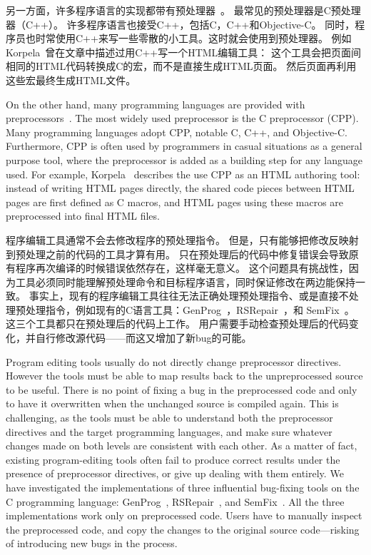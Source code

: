另一方面，许多程序语言的实现都带有预处理器~\parencite{ernst2002empirical,kohlbecker1986hygienic,lee2012marco}。
最常见的预处理器是C预处理器（C++）。
许多程序语言也接受C++，包括C，C++和Objective-C。
同时，程序员也时常使用C++来写一些零散的小工具。这时就会使用到预处理器。
例如Korpela~\parencite{Korpela2000}曾在文章中描述过用C++写一个HTML编辑工具：
这个工具会把页面间相同的HTML代码转换成C的宏，而不是直接生成HTML页面。
然后页面再利用这些宏最终生成HTML文件。

On the other hand, many programming languages are provided with
preprocessors~\parencite{ernst2002empirical,kohlbecker1986hygienic,lee2012marco}. The most
widely used preprocessor is the C preprocessor (CPP). Many programming
languages adopt CPP, notable C, C++, and
Objective-C. Furthermore, CPP is often used by
programmers in casual situations as a general purpose tool, 
where the preprocessor is added as a
building step for any language used. For example, Korpela~\parencite{Korpela2000} describes the
use CPP as an HTML authoring tool:
instead of writing HTML pages directly, the shared code pieces between HTML
pages are first defined as C macros, and HTML pages using these
macros are preprocessed into final HTML files.

程序编辑工具通常不会去修改程序的预处理指令。
但是，只有能够把修改反映射到预处理之前的代码的工具才算有用。
只在预处理后的代码中修复错误会导致原有程序再次编译的时候错误依然存在，这样毫无意义。
这个问题具有挑战性，因为工具必须同时能理解预处理命令和目标程序语言，同时保证修改在两边能保持一致。
事实上，现有的程序编辑工具往往无法正确处理预处理指令、或是直接不处理预处理指令，例如现有的C语言工具：GenProg~\parencite{le2012genprog,le2012systematic}，RSRepair~\parencite{QiMLDW14}，和
SemFix~\parencite{nguyen2013semfix}。
这三个工具都只在预处理后的代码上工作。
用户需要手动检查预处理后的代码变化，并自行修改源代码——而这又增加了新bug的可能。

Program editing tools usually do not directly change preprocessor directives. However the tools must be able to map results back to the unpreprocessed source to be useful. There is no point of fixing a bug in the preprocessed code and only to have it overwritten when the unchanged source is compiled again. This is challenging, as the tools must be able to understand both the preprocessor directives and the target programming languages, and make sure whatever changes made on both levels are consistent with each other. As a matter of fact, existing program-editing tools often fail to produce correct results under the presence of preprocessor directives, or give up dealing with them entirely. We have
investigated the implementations of three influential bug-fixing tools
on the C programming language: GenProg~\parencite{le2012genprog,le2012systematic}, RSRepair~\parencite{QiMLDW14}, and
SemFix~\parencite{nguyen2013semfix}. All the three implementations work only on
preprocessed code. Users have to manually inspect the
preprocessed code, and copy the changes to the original source code---risking of introducing new bugs in the process. 

